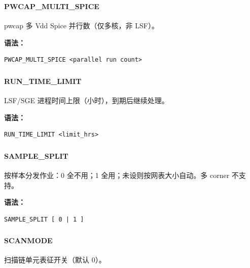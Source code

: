 \subsubsection{}
\paragraph*{PWCAP_MULTI_SPICE}

pwcap 多 Vdd Spice 并行数（仅多核，非 LSF）。

\textbf{语法：}
\begin{lstlisting}
PWCAP_MULTI_SPICE <parallel run count>
\end{lstlisting}

\subsubsection{}
\paragraph*{RUN_TIME_LIMIT}

LSF/SGE 进程时间上限（小时），到期后继续处理。

\textbf{语法：}
\begin{lstlisting}
RUN_TIME_LIMIT <limit_hrs>
\end{lstlisting}

\subsubsection{}
\paragraph*{SAMPLE_SPLIT}

按样本分发作业：0 全不用；1 全用；未设则按网表大小自动。多 corner 不支持。

\textbf{语法：}
\begin{lstlisting}
SAMPLE_SPLIT [ 0 | 1 ]
\end{lstlisting}

\subsubsection{}
\paragraph*{SCANMODE}

扫描链单元表征开关（默认 0）。

